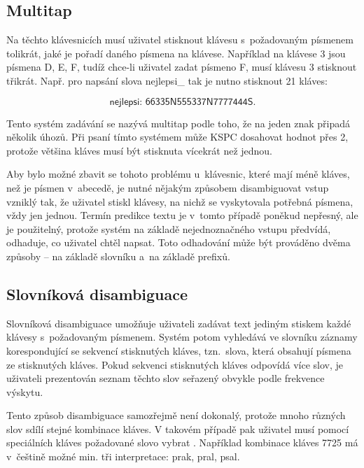 \documentclass[a4paper,11pt,openany]{book} %
\newcommand\exmp{\textsf}
\begin{document}
\subsection{Multitap}

Na těchto klávesnicích musí uživatel stisknout klávesu s~požadovaným písmenem tolikrát, jaké je pořadí daného písmena na klávese. Například na klávese \exmp{3} jsou písmena \exmp{D}, \exmp{E}, \exmp{F}, tudíž chce-li uživatel zadat písmeno \exmp{F}, musí klávesu \exmp{3} stisknout třikrát. Např. pro napsání slova \exmp{nejlepsi\_} tak je nutno stisknout 21 kláves:

\[
	\exmp{nejlepsi: 66335N555337N7777444S}.
\]

Tento systém zadávání se nazývá multitap podle toho, že na jeden znak připadá několik úhozů. Při psaní tímto systémem může KSPC dosahovat hodnot přes 2, protože většina kláves musí být stisknuta vícekrát než jednou. \parencite[202]{mackenzie2002kspc}

Aby bylo možné zbavit se tohoto problému u~klávesnic, které mají méně kláves, než je písmen v~abecedě, je nutné nějakým způsobem disambiguovat vstup vzniklý tak, že uživatel stiskl klávesy, na nichž se vyskytovala potřebná písmena, vždy jen jednou. Termín predikce textu je v~tomto případě poněkud nepřesný, ale je použitelný, protože systém na základě nejednoznačného vstupu předvídá, odhaduje, co uživatel chtěl napsat. Toto odhadování může být prováděno dvěma způsoby -- na základě slovníku a~na základě prefixů.

\subsection{Slovníková disambiguace}

Slovníková disambiguace umožňuje uživateli zadávat text jediným stiskem každé klávesy s~požadovaným písmenem. Systém potom vyhledává ve slovníku záznamy korespondující se sekvencí stisknutých kláves, tzn.~slova, která obsahují písmena ze stisknutých kláves. Pokud sekvenci stisknutých kláves odpovídá více slov, je uživateli prezentován seznam těchto slov seřazený obvykle podle frekvence výskytu. %

Tento způsob disambiguace samozřejmě není dokonalý, protože mnoho různých slov sdílí stejné kombinace kláves. V takovém případě pak uživatel musí pomocí speciálních kláves požadované slovo vybrat \parencite{MacKenzie2001}. Například kombinace kláves \exmp{7725} má v~češtině možné min. tři interpretace: \exmp{prak, pral, psal}.
\end{document}
